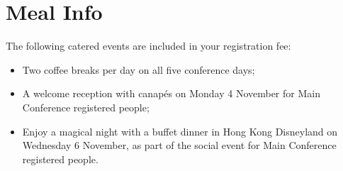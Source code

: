 \setheaders{}{}
\section{Meal Info}{}

The following catered events are included in your registration fee:

\begin{itemize}
    \item  Two coffee breaks per day on all five conference days;
    \item  A welcome reception with canapés on Monday 4 November for Main Conference registered people; 
    \item  Enjoy a magical night with a buffet dinner in Hong Kong Disneyland on Wednesday 6 November, as part of the social event for Main Conference registered people.
\end{itemize}


